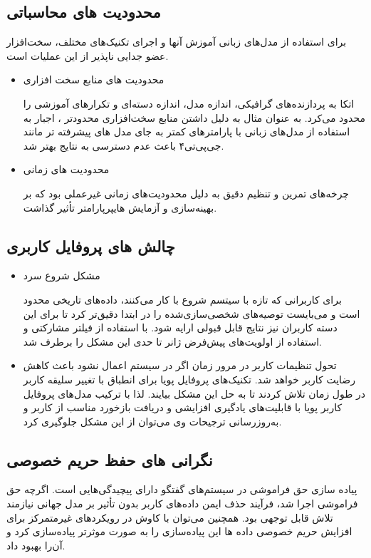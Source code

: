 \subsection{محدودیت های محاسباتی}
برای استفاده از مدل‌های زبانی آموزش آنها و اجرای تکنیک‌های مختلف، سخت‌افزار عضو جدایی ناپذیر از این عملیات است. 

\begin{itemize}
\item
محدودیت های منابع سخت افزاری

 اتکا به پردازنده‌های گرافیکی، اندازه مدل، اندازه دسته‌ای و تکرارهای آموزشی را محدود می‌کرد. به عنوان مثال به دلیل داشتن منابع سخت‌افزاری محدودتر ، اجبار به استفاده از مدل‌های زبانی با پارامترهای کمتر به جای مدل های پیشرفته تر مانند جی‌پی‌تی۴ باعث عدم دسترسی به نتایج بهتر شد.

\item
 محدودیت های زمانی

 چرخه‌های تمرین و تنظیم دقیق به دلیل محدودیت‌های زمانی غیرعملی بود که بر بهینه‌سازی و آزمایش هایپرپارامتر تأثیر گذاشت.
\end{itemize}


\subsection{چالش های پروفایل کاربری}
\begin{itemize}
\item
مشکل شروع سرد

برای کاربرانی که تازه با سیتسم شروع با کار می‌کنند، داده‌های تاریخی محدود است و می‌بایست توصیه‌های شخصی‌سازی‌شده را در ابتدا دقیق‌تر کرد تا برای این دسته کاربران نیز نتایج قابل قبولی ارایه شود. با استفاده از فیلتر مشارکتی و استفاده از اولویت‌های پیش‌فرض ژانر تا حدی این مشکل را برطرف شد.

\item
تحول تنظیمات کاربر در مرور زمان اگر در سیستم اعمال نشود باعث کاهش رضایت کاربر خواهد شد. تکنیک‌های پروفایل پویا برای انطباق با تغییر سلیقه کاربر در طول زمان تلاش کردند تا به حل این مشکل بیایند. لذا با ترکیب مدل‌های پروفایل کاربر پویا با قابلیت‌های یادگیری افزایشی و دریافت بازخورد مناسب از کاربر و به‌روزرسانی ترجیحات وی می‌توان از این مشکل جلوگیری کرد.
\end{itemize}

\subsection{نگرانی های حفظ حریم خصوصی}
پیاده سازی حق فراموشی در سیستم‌‌های گفتگو دارای پیچیدگی‌هایی است. اگرچه حق فراموشی اجرا شد، فرآیند حذف ایمن داده‌های کاربر بدون تأثیر بر مدل جهانی نیازمند تلاش قابل توجهی بود. همچنین می‌توان با کاوش در رویکردهای غیرمتمرکز برای افزایش حریم خصوصی داده ها این پیاده‌سازی را به صورت موثرتر پیاده‌سازی کرد و آن‌را بهبود داد.


